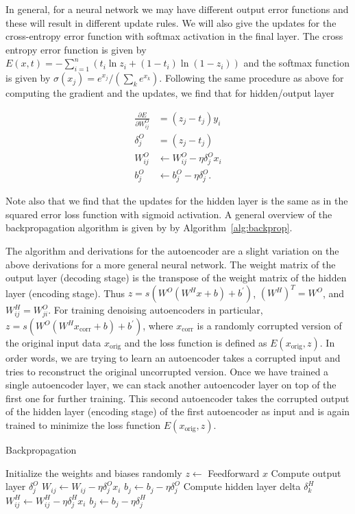 In general, for a neural network we may have different output error functions and these will result in different update rules. We will also give the updates
for the cross-entropy error function with softmax activation in the final layer.
The cross entropy error function is given by $E(x,t) = -\sum_{i=1}^n \left(t_i\ln z_i + (1-t_i)\ln(1-z_i)\right)$
and the softmax function is given by $\sigma(x_j) = e^{x_j} /(\sum_k e^{x_k})$. Following the same procedure as above
for computing the gradient and the updates, we find that for hidden/output layer

\begin{equation}
\begin{split}
\frac{\partial E}{\partial W^O_{ij}} &= (z_j - t_j)y_i \\
\delta^O_j &= (z_j-t_j) \\
W^O_{ij} &\leftarrow W^O_{ij} - \eta \delta^O_j x_i \\
b^O_j &\leftarrow b^O_j - \eta\delta^O_j.
\end{split}
\end{equation}

Note also that we find that the updates for the hidden layer is the same as in the squared error loss function with sigmoid activation. A general overview of the backpropagation algorithm is given by by Algorithm~\ref{alg:backprop}.

The algorithm and derivations for the autoencoder are a slight variation on the above derivations for a more general neural network. The weight matrix of the output layer (decoding stage) is the transpose of the weight matrix of the hidden layer (encoding stage). Thus $z=s(W^{O}(W^{H}x + b) + b^{'})$, $(W^H)^T = W^O$, and $W^H_{ij} = W^O_{ji}$. For training denoising autoencoders in particular, $z=s(W^{O}(W^{H}x_{\text{corr}} + b) + b^{'})$, where $x_{\text{corr}}$ is a randomly corrupted version of the original input data $x_{\text{orig}}$ and the loss function is defined as $E(x_{\text{orig}}, z)$. In order words, we are trying to learn an autoencoder takes a corrupted input and tries to reconstruct the original uncorrupted version. Once we have trained a single autoencoder layer, we can stack another autoencoder layer on top of the first one for further training. This second autoencoder takes the corrupted output of the hidden layer (encoding stage) of the first autoencoder as input and is again trained to minimize the loss function $E(x_{\text{orig}}, z)$.

\begin{algorithm}[h]
\caption{Backpropagation}
\label{alg:backprop}
\begin{algorithmic}
\STATE Initialize the weights and biases randomly
		\STATE $z\gets$ Feedforward $x$
		\STATE Compute output layer $\delta_j^O$
		\STATE ${W_{ij} \leftarrow W_{ij} - \eta \delta^O_j x_i}$
		\STATE $b_j \leftarrow b_j - \eta\delta^O_j$
			\STATE Compute hidden layer delta $\delta_k^H$
			\STATE ${W^H_{ij} \leftarrow W^H_{ij} - \eta\delta^H_jx_i}$
			\STATE $b_j \leftarrow b_j - \eta\delta^H_j$
		\ENDFOR
	\ENDFOR
\ENDFOR
\end{algorithmic}
\end{algorithm}

